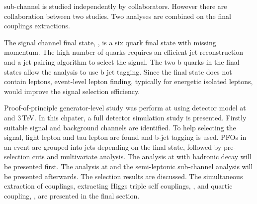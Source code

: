 
\eeToHHbbbb  sub-channel is studied independently by collaborators. However there are collaboration between two studies. Two analyses are combined on the final couplings extractions.


The signal channel final state, \eeToHHbbWWHadFull, is a six quark final state with missing momentum. The high number of quarks requires an efficient jet reconstruction and a jet pairing algorithm to select the signal. The two b quarks in the final states allow the analysis to use b jet tagging. Since the final state does not contain leptons, event-level lepton finding, typically for energetic isolated leptons,  would improve the signal selection efficiency.

Proof-of-principle generator-level study was perform at \CLIC using \CLICILD detector model at  and 3\,TeV\cite{Linssen:2012hp}. In this chpater, a full \CLICILD detector simulation study is presented. Firstly suitable signal and background channels are identified. To help selecting the signal, light lepton and tau lepton are found and b-jet tagging is used. PFOs in an event are grouped into jets depending on the final state, followed by pre-selection cuts and multivariate analysis. The analysis at  with \eeToHHbbWW hadronic decay will be presented first. The analysis at  and the semi-leptonic sub-channel analysis will be presented afterwards. The selection results are discussed. The simultaneous extraction of couplings, extracting Higgs triple self couplings, \gHHH, and quartic coupling, \gWWHH, are presented in the final section.

